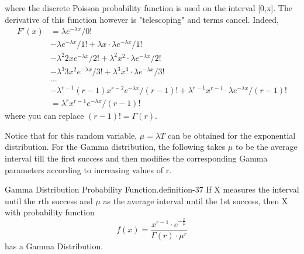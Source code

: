 \documentclass[10pt,]{book}
\numberwithin{equation}{section}
\begin{document}
where the discrete Poisson probability function is used on the interval [0,x]. The derivative of this function however is "telescoping" and terms cancel. Indeed,%
\begin{align*}
F'(x) & = \lambda e^{-\lambda x}/0!\\
& - \lambda e^{-\lambda x}/1! + \lambda x \cdot \lambda e^{-\lambda x}/1!\\
& - \lambda^2 2x e^{-\lambda x}/2! + \lambda^2 x^2 \cdot \lambda e^{-\lambda x}/2!\\
& - \lambda^3 3x^2 e^{-\lambda x}/3! + \lambda^3 x^3 \cdot \lambda e^{-\lambda x}/3!\\
& . . .\\
& - \lambda^{r-1} (r-1)x^{r-2} e^{-\lambda x}/(r-1)! + \lambda^{r-1} x^{r-1} \cdot \lambda e^{-\lambda x}/(r-1)!\\
& = \lambda^r x^{r-1} e^{-\lambda x}/(r-1)!
\end{align*}
where you can replace \((r-1)! = \Gamma(r)\).%
\par
\hypertarget{p-1121}{}%
Notice that for this random variable, \(\mu = \lambda T\) can be obtained for the exponential distribution. For the Gamma distribution, the following takes \(\mu\) to be the average interval till the first success and then modifies the corresponding Gamma parameters according to increasing values of r.%
\par
\hypertarget{p-1122}{}%
\begin{definition}{Gamma Distribution Probability Function.}{definition-37}%
\hypertarget{p-1123}{}%
If X measures the interval until the rth success and \(\mu\) as the average interval until the 1st success, then X with probability function%
\begin{equation*}
f(x) =  \frac{x^{r-1} \cdot e^{-\frac{x}{\mu}}}{\Gamma(r) \cdot \mu^r}
\end{equation*}
has a Gamma Distribution.%
\end{definition}
%
\par
\hypertarget{p-1124}{}%
\end{document}
